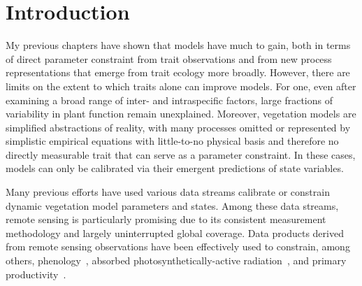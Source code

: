 \section{Introduction}

My previous chapters have shown that models have much to gain, both in terms of direct parameter constraint from trait observations and from new process representations that emerge from trait ecology more broadly.
However, there are limits on the extent to which traits alone can improve models.
For one, even after examining a broad range of inter- and intraspecific factors, large fractions of variability in plant function remain unexplained.
Moreover, vegetation models are simplified abstractions of reality, with many processes omitted or represented by simplistic empirical equations with little-to-no physical basis and therefore no directly measurable trait that can serve as a parameter constraint.
In these cases, models can only be calibrated via their emergent predictions of state variables.

Many previous efforts have used various data streams calibrate or constrain dynamic vegetation model parameters and states.
Among these data streams, remote sensing is particularly promising due to its consistent measurement methodology and largely uninterrupted global coverage.
Data products derived from remote sensing observations have been effectively used to constrain, among others,
phenology~\parencite{knorr2010carbon, viskari2015modeldata},
absorbed photosynthetically-active radiation~\parencite{peylin2016new, schurmann2016constraining},
and primary productivity~\parencite{macbean2018strong}.

